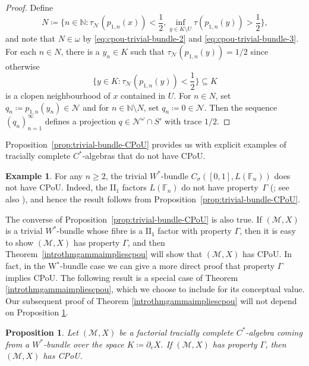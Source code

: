 \documentclass[a4paper,11pt]{amsart}
\newtheorem{proposition}[theorem]{Proposition}
\theoremstyle{definition}
\newtheorem{example}[theorem]{Example}
\numberwithin{equation}{section}
\numberwithin{theorem}{section}
\newcommand{\M}{\mathcal{M}}
\begin{document}
\begin{proof}
	Define 
	\begin{equation}
		N \coloneqq \Big\{n \in \mathbb N : \tau_{\mathcal N}(p_{1,n}(x)) < \frac12, \inf_{y \in K \setminus U} \tau(p_{1, n}(y)) > \frac12 \Big\},
	\end{equation}
	and note that $N \in \omega$ by \eqref{eq:cpou-trivial-bundle-2} and \eqref{eq:cpou-trivial-bundle-3}.  For each $n \in N$, there is a $y_n \in K$ such that $\tau_{\mathcal N}(p_{1, n}(y)) = 1/2$ since otherwise
	\begin{equation}
		\Big\{ y \in K : \tau_{\mathcal N}(p_{1 ,n}(y)) < \frac12 \Big\} \subseteq K
	\end{equation}
	is a clopen neighbourhood of $x$ contained in $U$.  For $n \in N$, set $q_n \coloneqq p_{1, n}(y_n) \in \mathcal N$ and for $n \in \mathbb N \setminus N$, set $q_n \coloneqq 0 \in \mathcal N$.  Then the sequence $(q_n)_{n=1}^\infty$ defines a projection $q \in \mathcal N^\omega \cap S'$ with trace $1/2$.
\end{proof}

Proposition~\ref{prop:trivial-bundle-CPoU} provides us with explicit examples of tracially complete $C^*$-algebras that do not have CPoU.

\begin{example}\label{eg:free-group-bundle}
	For any $n \geq 2$, the trivial $W^*$-bundle $C_\sigma([0,1], L(\mathbb{F}_n))$ does not have CPoU.  Indeed, the II$_1$ factors $L(\mathbb{F}_n)$ do not have property~$\Gamma$ (\cite{MvN43}; see also \cite[Theorem A.7.2]{Si08}), and hence the result follows from Proposition~\ref{prop:trivial-bundle-CPoU}.
\end{example}

The converse of Proposition~\ref{prop:trivial-bundle-CPoU} is also true.  If $(\M, X)$ is a trivial $W^*$-bundle whose fibre is a $\mathrm{II}_1$ factor with property $\Gamma$, then it is easy to show $(\M, X)$ has property $\Gamma$, and then Theorem~\ref{introthmgammaimpliescpou} will show that $(\M, X)$ has CPoU.  In fact, in the W$^*$-bundle case we can give a more direct proof that property $\Gamma$ implies CPoU.
The following result is a special case of Theorem \ref{introthmgammaimpliescpou}, which we choose to include for its conceptual value. Our subsequent proof of Theorem \ref{introthmgammaimpliescpou} will not depend on Proposition \ref{prop:Gamma-bundle}.

\begin{proposition}\label{prop:Gamma-bundle}
	Let $(\M,X)$ be a factorial tracially complete $C^*$-algebra coming from a $W^*$-bundle over the space $K \coloneqq \partial_e X$.
	If $(\M,X)$ has property $\Gamma$, then $(\M,X)$ has CPoU. 
\end{proposition}
\end{document}
